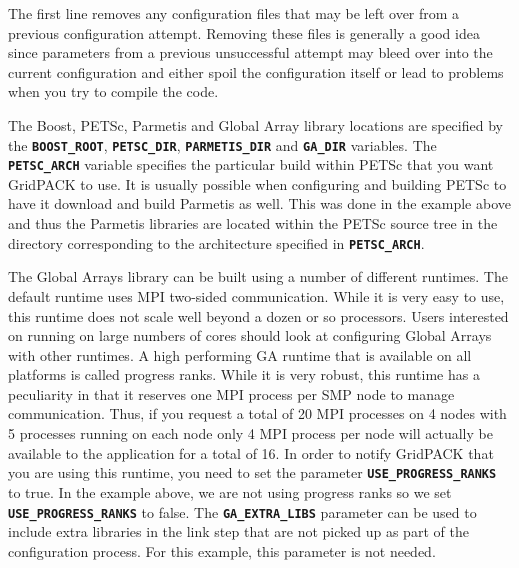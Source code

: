 The first line removes any configuration files that may be left over from a previous configuration attempt. Removing these files is generally a good idea since parameters from a previous unsuccessful attempt may bleed over into the current configuration and either spoil the configuration itself or lead to problems when you try to compile the code. 

The Boost, PETSc, Parmetis and Global Array library locations are specified by the \texttt{\textbf{BOOST\_ROOT}}, \texttt{\textbf{PETSC\_DIR}}, \texttt{\textbf{PARMETIS\_DIR}} and \texttt{\textbf{GA\_DIR}} variables. The \texttt{\textbf{PETSC\_ARCH}} variable specifies the particular build within PETSc that you want GridPACK to use. It is usually possible when configuring and building PETSc to have it download and build Parmetis as well. This was done in the example above and thus the Parmetis libraries are located within the PETSc source tree in the directory corresponding to the architecture specified in \texttt{\textbf{PETSC\_ARCH}}.

The Global Arrays library can be built using a number of different runtimes. The default runtime uses MPI two-sided communication. While it is very easy to use, this runtime does not scale well beyond a dozen or so processors. Users interested on running on large numbers of cores should look at configuring Global Arrays with other runtimes. A high performing GA runtime that is available on all platforms is called progress ranks. While it is very robust, this runtime has a peculiarity in that it reserves one MPI process per SMP node to manage communication. Thus, if you request a total of 20 MPI processes on 4 nodes with 5 processes running on each node only 4 MPI process per node will actually be available to the application for a total of 16. In order to notify GridPACK that you are using this runtime, you need to set the parameter \texttt{\textbf{USE\_PROGRESS\_RANKS}} to true. In the example above, we are not using progress ranks so we set \texttt{\textbf{USE\_PROGRESS\_RANKS}} to false.  The \texttt{\textbf{GA\_EXTRA\_LIBS}} parameter can be used to include extra libraries in the link step that are not picked up as part of the configuration process. For this example, this parameter is not needed.

